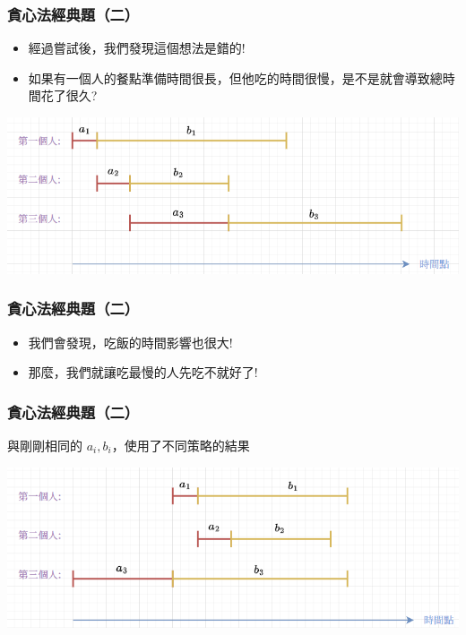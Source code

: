 \documentclass[aspectratio=169]{beamer}
\begin{document}
\begin{frame}
\frametitle{貪心法經典題（二）}
    \begin{itemize}
        \item<1-> 經過嘗試後，我們發現這個想法是錯的! \pause
        \item<2-> 如果有一個人的餐點準備時間很長，但他吃的時間很慢，是不是就會導致總時間花了很久? \pause
    \end{itemize}
    
    \begin{center}
        \includegraphics[scale=0.7]{images/dinner_1.png}
    \end{center}
\end{frame}

\begin{frame}
\frametitle{貪心法經典題（二）}
    \begin{itemize}
        \item<1-> 我們會發現，吃飯的時間影響也很大! 
        \item<2-> 那麼，我們就讓吃最慢的人先吃不就好了!
    \end{itemize}
\end{frame}

\begin{frame}
\frametitle{貪心法經典題（二）}
    與剛剛相同的 $a_i,b_i$，使用了不同策略的結果
    
    \begin{center}
        \includegraphics[scale=0.7]{images/dinner_2.png}
    \end{center}
\end{frame}
\end{document}
